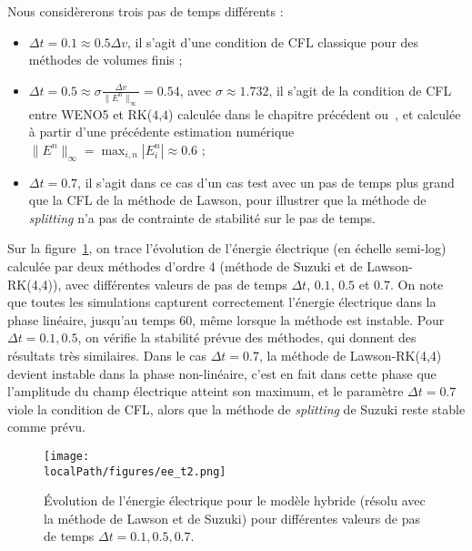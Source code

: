 Nous considèrerons trois pas de temps différents :
\begin{itemize}
  \item $\Delta t = 0.1 \approx 0.5\Delta v$, il s'agit d'une condition de CFL classique pour des méthodes de volumes finis ;
  \item $\Delta t = 0.5 \approx \sigma\frac{\Delta v}{\|E^n\|_\infty} = 0.54$, avec $\sigma\approx 1.732$, il s'agit de la condition de CFL entre WENO5 et RK($4$,$4$) calculée dans le chapitre précédent ou~\cite{Crouseilles:2019b}, et calculée à partir d'une précédente estimation numérique $\|E^n\|_\infty = \max_{i,n}|E^n_i|\approx 0.6$ ;
  \item $\Delta t = 0.7$, il s'agit dans ce cas d'un cas test avec un pas de temps plus grand que la CFL de la méthode de Lawson, pour illustrer que la méthode de \emph{splitting} n'a pas de contrainte de stabilité sur le pas de temps.
\end{itemize}

Sur la figure~\ref{fig:compare:ee}, on trace l'évolution de l'énergie électrique (en échelle semi-log) calculée par deux méthodes d'ordre 4 (méthode de Suzuki et de Lawson-RK(4,4)), avec différentes valeurs de pas de temps $\Delta t$, $0.1$, $0.5$ et $0.7$. On note que toutes les simulations capturent correctement l'énergie électrique dans la phase linéaire, jusqu'au temps 60, même lorsque la méthode est instable. Pour $\Delta t=0.1,0.5$, on vérifie la stabilité prévue des méthodes, qui donnent des résultats très similaires. Dans le cas $\Delta t=0.7$, la méthode de Lawson-RK(4,4) devient instable dans la phase non-linéaire, c'est en fait dans cette phase que l'amplitude du champ électrique atteint son maximum, et le paramètre $\Delta t=0.7$ viole la condition de CFL, alors que la méthode de \emph{splitting} de Suzuki reste stable comme prévu.

\begin{figure}[h]
  \centering
  \texttt{[image: \\localPath/figures/ee\_t2.png]}
  \caption{Évolution de l'énergie électrique pour le modèle hybride (résolu avec la méthode de Lawson et de Suzuki) pour différentes valeurs de pas de temps $\Delta t=0.1,0.5,0.7$.}
  \label{fig:compare:ee}
\end{figure}


